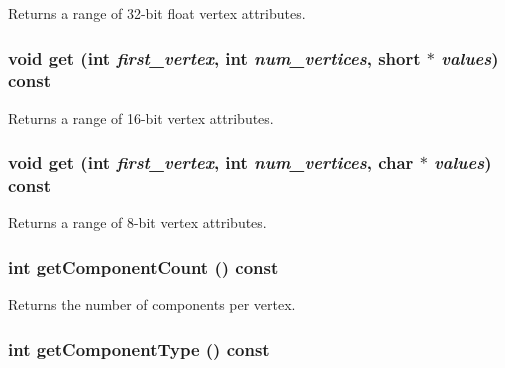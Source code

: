 Returns a range of 32-bit float vertex attributes. \hypertarget{classm3g_1_1VertexArray_575822f60d7b5e74ed51e94851123038}{
\subsubsection[{get}]{\setlength{\rightskip}{0pt plus 5cm}void get (int {\em first\_\-vertex}, \/  int {\em num\_\-vertices}, \/  short $\ast$ {\em values}) const}}
\label{classm3g_1_1VertexArray_575822f60d7b5e74ed51e94851123038}


Returns a range of 16-bit vertex attributes. \hypertarget{classm3g_1_1VertexArray_9d1b801a7c196a07553a5ef4a5473573}{
\subsubsection[{get}]{\setlength{\rightskip}{0pt plus 5cm}void get (int {\em first\_\-vertex}, \/  int {\em num\_\-vertices}, \/  char $\ast$ {\em values}) const}}
\label{classm3g_1_1VertexArray_9d1b801a7c196a07553a5ef4a5473573}


Returns a range of 8-bit vertex attributes. \hypertarget{classm3g_1_1VertexArray_7016f51d2788e78fdd736efd040f5e5e}{
\subsubsection[{getComponentCount}]{\setlength{\rightskip}{0pt plus 5cm}int getComponentCount () const}}
\label{classm3g_1_1VertexArray_7016f51d2788e78fdd736efd040f5e5e}


Returns the number of components per vertex. \hypertarget{classm3g_1_1VertexArray_9b7b78fbff0603779ec6bdd2a323c939}{
\subsubsection[{getComponentType}]{\setlength{\rightskip}{0pt plus 5cm}int getComponentType () const}}
\label{classm3g_1_1VertexArray_9b7b78fbff0603779ec6bdd2a323c939}



